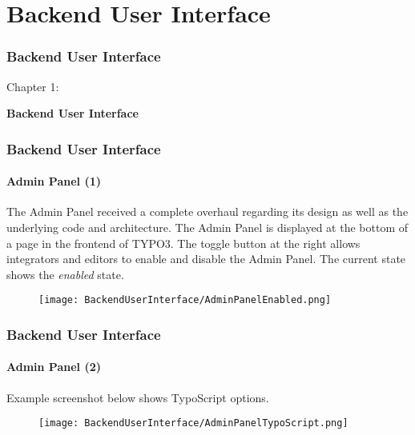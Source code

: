 %

\section{Backend User Interface}
\begin{frame}[fragile]
	\frametitle{Backend User Interface}

	\begin{center}\huge{Chapter 1:}\end{center}
	\begin{center}\huge{\color{typo3darkgrey}\textbf{Backend User Interface}}\end{center}

\end{frame}


\begin{frame}[fragile]
	\frametitle{Backend User Interface}
	\framesubtitle{Admin Panel (1)}

    The Admin Panel received a complete overhaul regarding its design as well as
    the underlying code and architecture.
	\newline\newline
	The Admin Panel is displayed at the bottom of a page in the frontend of TYPO3.
	The toggle button at the right allows integrators and editors to enable and
	disable the Admin Panel. The current state shows the \textit{enabled} state.

	\begin{figure}
		\texttt{[image: BackendUserInterface/AdminPanelEnabled.png]}
	\end{figure}

\end{frame}


\begin{frame}[fragile]
	\frametitle{Backend User Interface}
	\framesubtitle{Admin Panel (2)}

	Example screenshot below shows TypoScript options.

	\begin{figure}
		\texttt{[image: BackendUserInterface/AdminPanelTypoScript.png]}
	\end{figure}

\end{frame}


